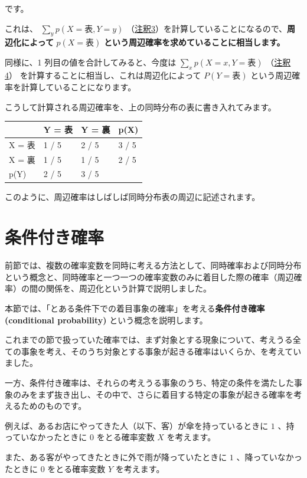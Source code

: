 です。

これは、 $\sum_y p(X = 表, Y = y)$ （\hyperref[06b-basics-of-probability-statistics-note3]{注釈3}）を計算していることになるので、\textbf{周辺化によって} $p(X = 表)$ \textbf{という周辺確率を求めていることに相当します。}


同様に、1 列目の値を合計してみると、今度は $\sum_x p(X = x, Y = 表)$ （\hyperref[06b-basics-of-probability-statistics-note4]{注釈4}） を計算することに相当し、これは周辺化によって $P(Y = 表)$ という周辺確率を計算していることになります。


こうして計算される周辺確率を、上の同時分布の表に書き入れてみます。


\begin{center}
\begin{tabular}{|l|l|l|l|}
\hline
$\ $ & Y = 表 & Y = 裏 & p(X) \\
\hline
X = 表 & 1 / 5 & 2 / 5 & 3 / 5 \\
X = 裏 & 1 / 5 & 1 / 5 & 2 / 5 \\
p(Y) & 2 / 5 & 3 / 5 &  \\
\hline
\end{tabular}
\end{center}


このように、周辺確率はしばしば同時分布表の周辺に記述されます。


\section{条件付き確率}


前節では、複数の確率変数を同時に考える方法として、同時確率および同時分布という概念と、同時確率と一つ一つの確率変数のみに着目した際の確率（周辺確率）の間の関係を、周辺化という計算で説明しました。

本節では、「とある条件下での着目事象の確率」を考える\textbf{条件付き確率 (conditional probability)} という概念を説明します。

これまでの節で扱っていた確率では、まず対象とする現象について、考えうる全ての事象を考え、そのうち対象とする事象が起きる確率はいくらか、を考えていました。

一方、条件付き確率は、それらの考えうる事象のうち、特定の条件を満たした事象のみをまず抜き出し、その中で、さらに着目する特定の事象が起きる確率を考えるためのものです。


例えば、あるお店にやってきた人（以下、客）が傘を持っているときに $1$ 、持っていなかったときに $0$ をとる確率変数 $X$ を考えます。

また、ある客がやってきたときに外で雨が降っていたときに $1$ 、降っていなかったときに $0$ をとる確率変数 $Y$ を考えます。

